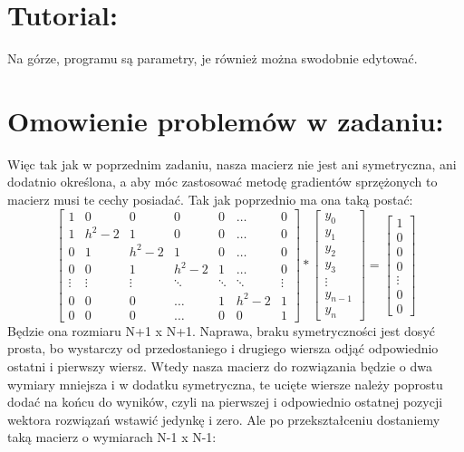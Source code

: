 \documentclass[12pt]{article}
\begin{document}
\section{Tutorial:}
Na górze, programu są parametry, je również można swodobnie edytować. 
\section{Omowienie problemów w zadaniu:}
Więc tak jak w poprzednim zadaniu, nasza macierz nie jest ani symetryczna, ani dodatnio określona, a aby móc zastosować metodę gradientów sprzężonych to macierz musi te cechy posiadać. Tak jak poprzednio ma ona taką postać:
\[
\begin{bmatrix}
    1 & 0 & 0 & 0 & 0 & \dots & 0\\
    1 & h^{2}-2 & 1 & 0 & 0 & \dots & 0\\ 
    0 & 1 & h^{2}-2 & 1 & 0 & \dots & 0\\
    0 & 0 & 1 & h^{2}-2 & 1 &\dots & 0\\
    \vdots & \vdots & \vdots & \ddots & \ddots & \ddots & \vdots\\
    0 & 0 & 0 & \hdots & 1 & h^{2}-2 & 1\\
    0 & 0 & 0 & \hdots & 0 & 0 & 1
\end{bmatrix}
*
\begin{bmatrix}
    y_{0}\\
    y_{1}\\
    y_{2}\\
    y_{3}\\
    \vdots\\
    y_{n-1}\\
    y_{n}
\end{bmatrix}
=
\begin{bmatrix}
    1\\
    0\\
    0\\
    0\\
    \vdots\\
    0\\
    0
\end{bmatrix}
\]
Będzie ona rozmiaru N+1 x N+1. Naprawa, braku symetryczności jest dosyć prosta, bo wystarczy od przedostaniego i drugiego wiersza odjąć odpowiednio ostatni i pierwszy wiersz. Wtedy nasza macierz do rozwiązania będzie o dwa wymiary mniejsza i w dodatku symetryczna, te ucięte wiersze należy poprostu dodać na końcu do wyników, czyli na pierwszej i odpowiednio ostatnej pozycji wektora rozwiązań wstawić jedynkę i zero. Ale po przekształceniu dostaniemy taką macierz o wymiarach N-1 x N-1:
\end{document}
